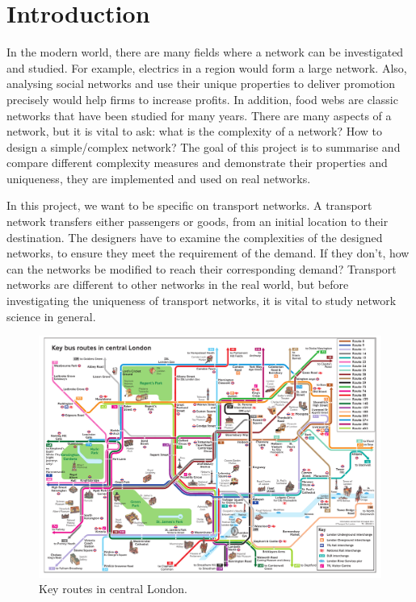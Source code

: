 \documentclass[12pt]{article}
\begin{document}
\section{Introduction}
\par
In the modern world, there are many fields where a network can be investigated and studied. For example, electrics in a region would form a large network.\cite{5275353} Also, analysing social networks and use their unique properties to deliver promotion precisely would help firms to increase profits.\cite{stefko2011virtual} In addition, food webs are classic networks that have been studied for many years.\cite{dunne2002food} There are many aspects of a network, but it is vital to ask: what is the complexity of a network? How to design a simple/complex network? The goal of this project is to summarise and compare different complexity measures and demonstrate their properties and uniqueness, they are implemented and used on real networks.
\par
In this project, we want to be specific on transport networks. A transport network transfers either passengers or goods, from an initial location to their destination. The designers have to examine the complexities of the designed networks, to ensure they meet the requirement of the demand. If they don't, how can the networks be modified to reach their corresponding demand? Transport networks are different to other networks in the real world, but before investigating the uniqueness of transport networks, it is vital to study network science in general.\\
\begin{figure}[!h]
    \centering
    \includegraphics[width=\textwidth]{key-bus-routes-in-central-london.pdf}
    \caption{Key routes in central London.\cite{london_bus}}
\end{figure}
\end{document}
